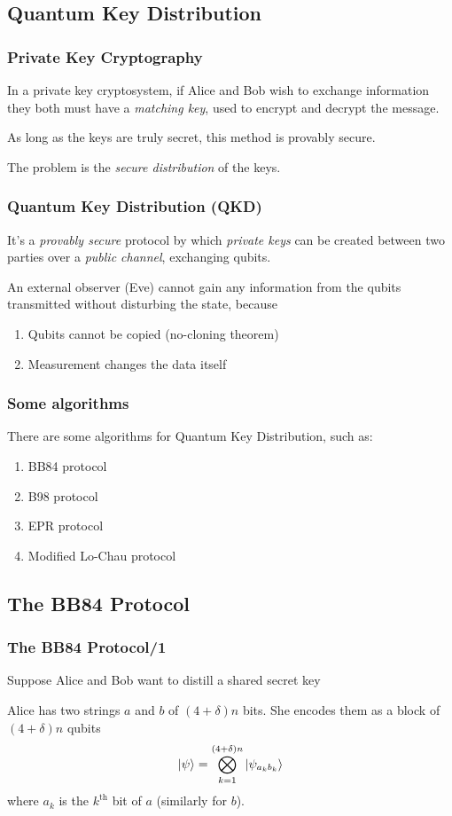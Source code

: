 \documentclass{beamer}
\begin{document}
  \subsection{Quantum Key Distribution}
  \begin{frame}
    \frametitle{Private Key Cryptography}
    In a private key cryptosystem, if Alice and Bob wish to exchange information they
    both must have a \textit{matching key}, used to encrypt and decrypt the message.

    As long as the keys are truly secret, this method is provably secure.

    The problem is the \textit{secure distribution}
    of the keys.
  \end{frame}
  \begin{frame}
    \frametitle{Quantum Key Distribution (QKD)}
    It's a \textit{provably secure} protocol by which \textit{private keys} can be created
    between two parties over a \textit{public channel}, exchanging qubits.

    An external observer (Eve) cannot gain any information from the qubits
    transmitted without disturbing the state, because
    \begin{enumerate}
      \item Qubits cannot be copied (no-cloning theorem)
      \item Measurement changes the data itself
    \end{enumerate}
  \end{frame}
  \begin{frame}
    \frametitle{Some algorithms}
    There are some algorithms for Quantum Key Distribution, such as:
    \begin{enumerate}
      \item BB84 protocol
      \item B98 protocol
      \item EPR protocol
      \item Modified Lo-Chau protocol
    \end{enumerate}  
  \end{frame}

  \subsection{The BB84 Protocol}
  \begin{frame}
    \frametitle{The BB84 Protocol/1}
    Suppose Alice and Bob want to distill a shared secret key
    
    Alice has two strings $a$ and $b$ of $(4+\delta)n$ bits.
    She encodes them as a block of $(4+\delta)n$ qubits
    \begin{equation*}
      \ket{\psi} = \bigotimes_{k=1}^{(4+\delta)n} \ket{\psi_{a_kb_k}}
    \end{equation*}
    where $a_k$ is the $k^\text{th}$ bit of $a$ (similarly for $b$).
  \end{frame}
\end{document}
